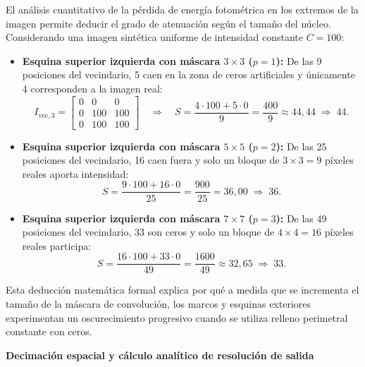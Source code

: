 \documentclass[11pt]{article}
\begin{document}
El análisis cuantitativo de la pérdida de energía fotométrica en los extremos de la imagen permite deducir el grado de atenuación según el tamaño del núcleo. Considerando una imagen sintética uniforme de intensidad constante $C = 100$:
\begin{itemize}[itemsep=0.2em]
\item \textbf{Esquina superior izquierda con máscara $3\times3$ ($p=1$):} De las 9 posiciones del vecindario, 5 caen en la zona de ceros artificiales y únicamente 4 corresponden a la imagen real:
\begin{equation}
I_{\text{vec}, 3} = \begin{bmatrix} 0 & 0 & 0 \\ 0 & 100 & 100 \\ 0 & 100 & 100 \end{bmatrix} \quad\Rightarrow\quad S = \frac{4 \cdot 100 + 5 \cdot 0}{9} = \frac{400}{9} \approx 44,44 \;\Rightarrow\; 44.
\end{equation}
\item \textbf{Esquina superior izquierda con máscara $5\times5$ ($p=2$):} De las 25 posiciones del vecindario, 16 caen fuera y solo un bloque de $3\times3 = 9$ píxeles reales aporta intensidad:
\begin{equation}
S = \frac{9 \cdot 100 + 16 \cdot 0}{25} = \frac{900}{25} = 36,00 \;\Rightarrow\; 36.
\end{equation}
\item \textbf{Esquina superior izquierda con máscara $7\times7$ ($p=3$):} De las 49 posiciones del vecindario, 33 son ceros y solo un bloque de $4\times4 = 16$ píxeles reales participa:
\begin{equation}
S = \frac{16 \cdot 100 + 33 \cdot 0}{49} = \frac{1600}{49} \approx 32,65 \;\Rightarrow\; 33.
\end{equation}
\end{itemize}
Esta deducción matemática formal explica por qué a medida que se incrementa el tamaño de la máscara de convolución, los marcos y esquinas exteriores experimentan un oscurecimiento progresivo cuando se utiliza relleno perimetral constante con ceros.

\textbf{Decimación espacial y cálculo analítico de resolución de salida}
\end{document}
